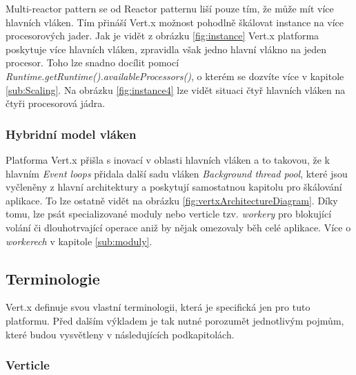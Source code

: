 Multi-reactor pattern\cite{eventLoops} se od Reactor patternu liší pouze tím, že může mít více hlavních vláken. Tím přináší Vert.x možnost pohodlně škálovat instance na více procesorových jader. Jak je vidět z obrázku \vref{fig:instance} Vert.x platforma poskytuje více hlavních vláken, zpravidla však jedno hlavní vlákno na jeden procesor. Toho lze snadno docílit pomocí \emph{Runtime.getRuntime().availableProcessors()}, o kterém se dozvíte více v kapitole \ref{sub:Scaling}. Na obrázku \vref{fig:instance4} lze vidět situaci čtyř hlavních vláken na čtyři procesorová jádra.

\subsubsection{Hybridní model vláken}\label{sub:hybrid}

Platforma Vert.x přišla s inovací v oblasti hlavních vláken a to takovou, že k hlavním \emph{Event loops} přidala další sadu vláken \emph{Background thread pool}, které jsou vyčleněny z hlavní architektury a poskytují samostatnou kapitolu pro škálování aplikace. To lze ostatně vidět na obrázku \vref{fig:vertxArchitectureDiagram}. Díky tomu, lze psát specializované moduly nebo verticle tzv. \emph{workery} pro blokující volání či dlouhotrvající operace aniž by nějak omezovaly běh celé aplikace. Více o \emph{workerech} v kapitole \ref{sub:moduly}.

\subsection{Terminologie}

Vert.x definuje svou vlastní terminologii, která je specifická jen pro tuto platformu. Před dalším výkladem je tak nutné porozumět jednotlivým pojmům, které budou vysvětleny v následujících podkapitolách.

\subsubsection{Verticle}\label{sub:verticle}

